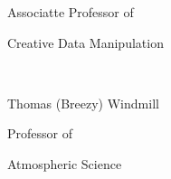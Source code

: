 {\hspace{3.2 in} Associatte Professor of

\vspace{-.2 in}

\hspace{3.2 in} Creative Data Manipulation



\vspace{.2 in plus 1fill}

\hspace{3.2 in} \hrulefill\

\vspace{-.2 in}

\hspace{3.2 in} Thomas (Breezy) Windmill
\vspace{-.1 in}

\hspace{3.2 in} Professor of
\vspace{-.2 in}

\hspace{3.2 in} Atmospheric Science

\vspace{0 in plus 1fill}

}

